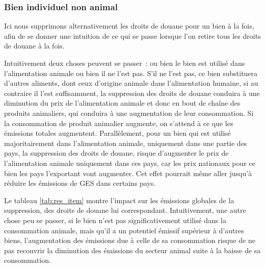 \subsubsection{Bien individuel non animal}

Ici nous supprimons alternativement les droits de douane pour un bien à la fois, afin de se donner une intuition de ce qui se passe lorsque l'on retire tous les droits de douane à la fois.

Intuitivement deux choses peuvent se passer~: ou bien le bien est utilisé dans l'alimentation animale ou bien il ne l'est pas. S'il ne l'est pas, ce bien substituera d'autres aliments, dont ceux d'origine animale dans l'alimentation humaine, si au contraire il l'est suffisamment, la suppression des droits de douane conduira à une diminution du prix de l'alimentation animale et donc en bout de chaîne des produits animaliers, qui conduira à une augmentation de leur consommation. Si la consommation de produit animalier augmente, on s'attend à ce que les émissions totales augmentent. Parallèlement, pour un bien qui est utilisé majoritairement dans l'alimentation animale, uniquement dans une partie des pays, la suppression des droits de douane, risque d'augmenter le prix de l'alimentation animale uniquement dans ces pays, car les prix nationaux pour ce bien les pays l'exportant vont augmenter. Cet effet pourrait même aller jusqu'à réduire les émissions de GES dans certains pays.

Le tableau \ref{tab:res_item} montre l'impact sur les émissions globales de la suppression, des droits de douane lui correspondant. Intuitivement, une autre chose peu se passer, si le bien n'est pas significativement utilisé dans la consommation animale, mais qu'il a un potentiel émissif supérieur à d'autres biens, l'augmentation des émissions due à celle de sa consommation risque de ne pas recouvrir la diminution des émissions du secteur animal suite à la baisse de sa consommation.

